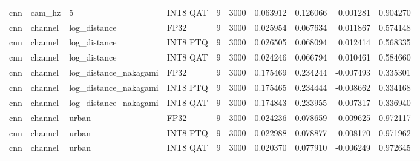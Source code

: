 \begin{tabular}{llllrrrrrr}
cnn & cam\_hz & 5 & INT8 QAT & 9 & 3000 & 0.063912 & 0.126066 & 0.001281 & 0.904270 \\
cnn & channel & log\_distance & FP32 & 9 & 3000 & 0.025954 & 0.067634 & 0.011867 & 0.574148 \\
cnn & channel & log\_distance & INT8 PTQ & 9 & 3000 & 0.026505 & 0.068094 & 0.012414 & 0.568335 \\
cnn & channel & log\_distance & INT8 QAT & 9 & 3000 & 0.024246 & 0.066794 & 0.010461 & 0.584660 \\
cnn & channel & log\_distance\_nakagami & FP32 & 9 & 3000 & 0.175469 & 0.234244 & -0.007493 & 0.335301 \\
cnn & channel & log\_distance\_nakagami & INT8 PTQ & 9 & 3000 & 0.175465 & 0.234444 & -0.008662 & 0.334168 \\
cnn & channel & log\_distance\_nakagami & INT8 QAT & 9 & 3000 & 0.174843 & 0.233955 & -0.007317 & 0.336940 \\
cnn & channel & urban & FP32 & 9 & 3000 & 0.024236 & 0.078659 & -0.009625 & 0.972117 \\
cnn & channel & urban & INT8 PTQ & 9 & 3000 & 0.022988 & 0.078877 & -0.008170 & 0.971962 \\
cnn & channel & urban & INT8 QAT & 9 & 3000 & 0.020370 & 0.077910 & -0.006249 & 0.972645 \\
\bottomrule
\end{tabular}
